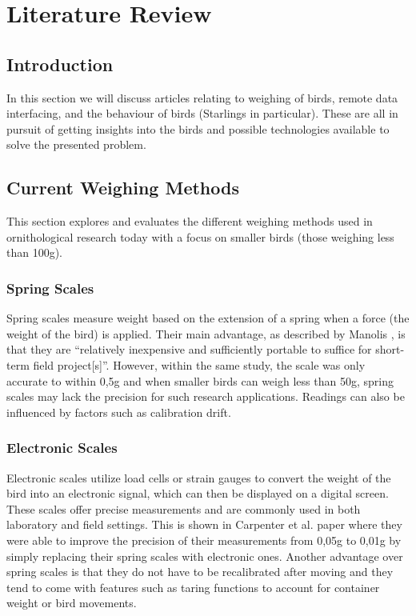 \documentclass[class=report,11pt,crop=false]{standalone}
\begin{document}
\ifstandalone
\tableofcontents
\fi
\chapter{Literature Review \label{ch:literature}}
\vspace{0.5cm}

\section{Introduction}
In this section we will discuss articles relating to weighing of birds, remote data interfacing, and the behaviour of birds (Starlings in particular). These are all in pursuit of getting insights into the birds and possible technologies available to solve the presented problem.


\section{Current Weighing Methods}
This section explores and evaluates the different weighing methods used in ornithological research today with a focus on smaller birds (those weighing less than 100g).

\subsection{Spring Scales}
Spring scales measure weight based on the extension of a spring when a force (the weight of the bird) is applied. Their main advantage, as described by Manolis \cite{manoils2024simple}, is that they are “relatively inexpensive and sufficiently portable to suffice for short-term field project[s]”. However, within the same study, the scale was only accurate to within 0,5g and when smaller birds can weigh less than 50g, spring scales may lack the precision for such research applications. Readings can also be influenced by factors such as calibration drift.

\subsection{Electronic Scales}
Electronic scales utilize load cells or strain gauges to convert the weight of the bird into an electronic signal, which can then be displayed on a digital screen. These scales offer precise measurements and are commonly used in both laboratory and field settings. This is shown in Carpenter et al. \cite{carpenter1983weight} paper where they were able to improve the precision of their measurements from 0,05g to 0,01g by simply replacing their spring scales with electronic ones. Another advantage over spring scales is that they do not have to be recalibrated after moving \cite{carpenter1983weight} and they tend to come with features such as taring functions to account for container weight or bird movements.
\end{document}
